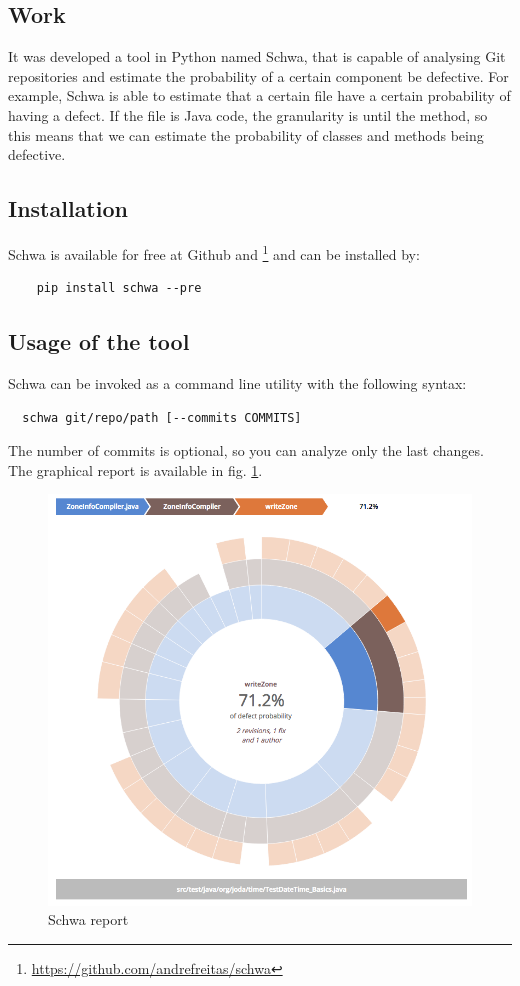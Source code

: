 \documentclass[9pt,a4paper]{extarticle}
\begin{document}
\begin{multicols}{2}
\section{Work}\label{sec:work}
It was developed a tool in Python named Schwa, that is capable
of analysing Git repositories and estimate the probability of a certain component
be defective. For example, Schwa is able to estimate that a certain file have
a certain probability of having a defect. If the file is Java code, the granularity
is until the method, so this means that we can estimate the probability of classes
and methods being defective.

\subsection{Installation}
Schwa is available for free at Github and
\footnote{\url{https://github.com/andrefreitas/schwa}} and can be installed by:
\begin{verbatim}
    pip install schwa --pre
\end{verbatim}

\subsection{Usage of the tool}
Schwa can be invoked as a command line utility with the following syntax:

\begin{verbatim}
  schwa git/repo/path [--commits COMMITS]
\end{verbatim}

The number of commits is optional, so you can analyze only the last changes. The
graphical report is available in fig. \ref{fig:sunburst}.

\begin{figure}[H]
\centerline{\includegraphics[scale=.25]{sunburst.png}}
\caption{Schwa report}
\label{fig:sunburst}
\end{figure}


\end{multicols}
\end{document}

